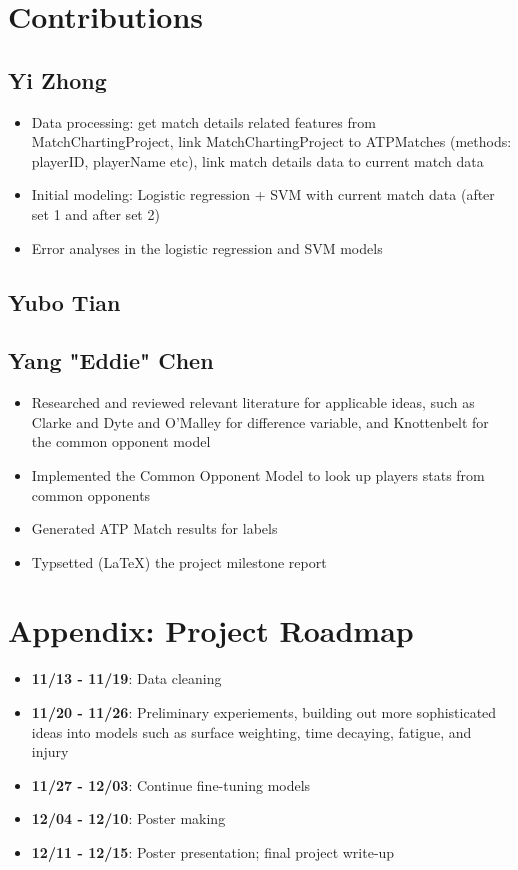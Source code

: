 \documentclass[paper=a4, fontsize=11pt]{scrartcl} %
\numberwithin{equation}{section} %
\numberwithin{figure}{section} %
\numberwithin{table}{section} %
\begin{document}
\pagebreak
\appendix

\section{Contributions}
\subsection{Yi Zhong}
\begin{itemize}
\item Data processing: get match details related features from MatchChartingProject, link MatchChartingProject to ATPMatches (methods: playerID, playerName etc), link match details data to current match data
\item Initial modeling: Logistic regression + SVM with current match data (after set 1 and after set 2)
\item Error analyses in the logistic regression and SVM models
\end{itemize}


\subsection{Yubo Tian}
\subsection{Yang "Eddie" Chen}
\begin{itemize}
\item Researched and reviewed relevant literature for applicable ideas, such as Clarke and Dyte \cite{Clarke2010} and O'Malley \cite{omalley} for difference variable, and Knottenbelt \cite{KNOTTENBELT20123820} for the common opponent model
\item Implemented the Common Opponent Model to look up players stats from common opponents
\item Generated ATP Match results for labels
\item Typsetted (\LaTeX) the project milestone report
\end{itemize}

\section{Appendix: Project Roadmap}
\begin{itemize}
\item \textbf{11/13 - 11/19}: Data cleaning
\item \textbf{11/20 - 11/26}: Preliminary experiements, building out more sophisticated ideas into models such as surface weighting, time decaying, fatigue, and injury
\item \textbf{11/27 - 12/03}: Continue fine-tuning models
\item \textbf{12/04 - 12/10}: Poster making
\item \textbf{12/11 - 12/15}: Poster presentation; final project write-up
\end{itemize}
\end{document}
